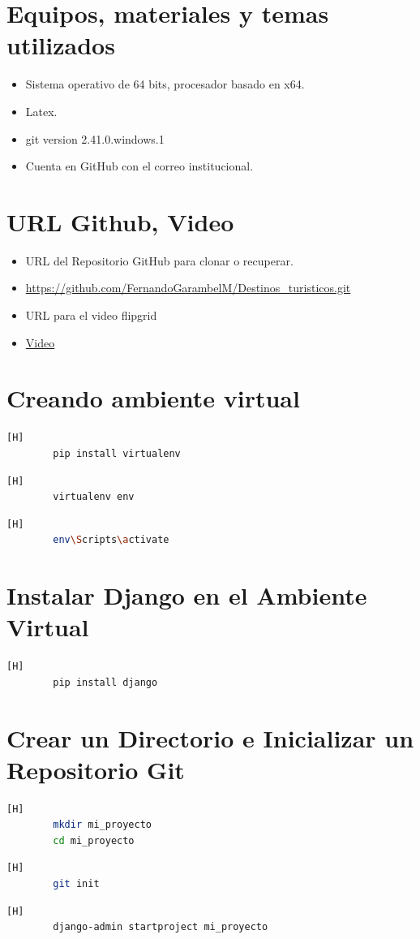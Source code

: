 \documentclass{article}
\begin{document}
\section{Equipos, materiales y temas utilizados}
	\begin{itemize}
		\item Sistema operativo de 64 bits, procesador basado en x64.
		\item Latex. 
		\item git version 2.41.0.windows.1
		\item Cuenta en GitHub con el correo institucional.
	\end{itemize}
\section{URL Github, Video}
	\begin{itemize}
		\item URL del Repositorio GitHub para clonar o recuperar.
		\item \url{https://github.com/FernandoGarambelM/Destinos_turisticos.git}
		\item URL para el video flipgrid
		\item \url{Video}	
	\end{itemize}
	\clearpage
\section{Creando ambiente virtual}
	\begin{lstlisting}[language=bash,caption={Instalar virtualenv}][H]
		pip install virtualenv
	\end{lstlisting}
	\begin{lstlisting}[language=bash,caption={Crear el ambiente virtual}][H]
		virtualenv env
	\end{lstlisting}
	\begin{lstlisting}[language=bash,caption={Activar el ambiente virtual}][H]
		env\Scripts\activate
	\end{lstlisting}
\section{Instalar Django en el Ambiente Virtual}
	\begin{lstlisting}[language=bash,caption={Instalar Django}][H]
		pip install django
	\end{lstlisting}
\section{Crear un Directorio e Inicializar un Repositorio Git}
	\begin{lstlisting}[language=bash,caption={Crear un directorio para el proyecto}][H]
		mkdir mi_proyecto
		cd mi_proyecto
	\end{lstlisting}
	\begin{lstlisting}[language=bash,caption={Inicializar un repositorio Git}][H]
		git init
	\end{lstlisting}
	\begin{lstlisting}[language=bash,caption={Crear un proyecto Django}][H]
		django-admin startproject mi_proyecto
	\end{lstlisting}
\end{document}
